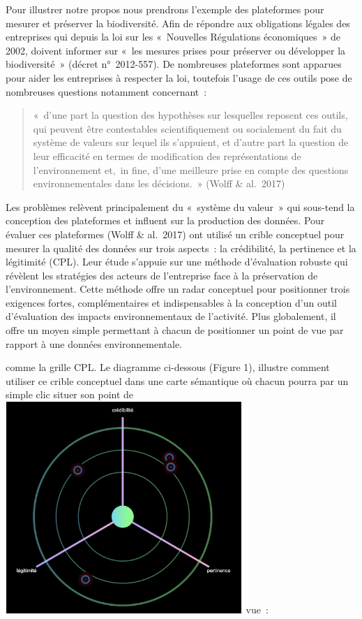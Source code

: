 \documentclass[
  a4paper,
  DIV=11,
  numbers=noendperiod]{scrreprt}
\begin{document}
Pour illustrer notre propos nous prendrons l'exemple des plateformes
pour mesurer et préserver la biodiversité. Afin de répondre aux
obligations légales des entreprises qui depuis la loi sur les
«~Nouvelles Régulations économiques~» de 2002, doivent informer sur
«~les mesures prises pour préserver ou développer la biodiversité~»
(décret n°~2012-557). De nombreuses plateformes sont apparues pour aider
les entreprises à respecter la loi, toutefois l'usage de ces outils pose
de nombreuses questions notamment concernant~:

\begin{quote}
«~d'une part la question des hypothèses sur lesquelles reposent ces
outils, qui peuvent être contestables scientifiquement ou socialement du
fait du système de valeurs sur lequel ils s'appuient, et d'autre part la
question de leur efficacité en termes de modification des
représentations de l'environnement et,~in fine, d'une meilleure prise en
compte des questions environnementales dans les décisions.~» (Wolff \&
al.~2017)
\end{quote}

Les problèmes relèvent principalement du «~système du valeur~» qui
sous-tend la conception des plateformes et influent sur la production
des données. Pour évaluer ces plateformes (Wolff \& al.~2017) ont
utilisé un crible conceptuel pour mesurer la qualité des données sur
trois aspects~: la crédibilité, la pertinence et la légitimité (CPL).
Leur étude s'appuie sur une méthode d'évaluation robuste qui révèlent
les stratégies des acteurs de l'entreprise face à la préservation de
l'environnement. Cette méthode offre un radar conceptuel pour
positionner trois exigences fortes, complémentaires et indispensables à
la conception d'un outil d'évaluation des impacts environnementaux de
l'activité. Plus globalement, il offre un moyen simple permettant à
chacun de positionner un point de vue par rapport à une données
environnementale.

comme la grille CPL. Le diagramme ci-dessous (Figure 1), illustre
comment utiliser ce crible conceptuel dans une carte sémantique où
chacun pourra par un simple clic situer son point
de\includegraphics[width=8.992cm,height=8.026cm]{media/1000000100000531000004ADCDEC4EC1C68E3B55.png}
vue~:
\end{document}
